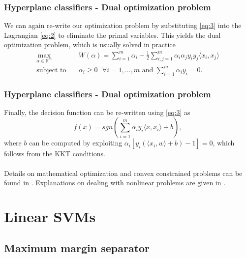 \documentclass{beamer}
\begin{document}
\begin{frame}{}
    \frametitle{Hyperplane classifiers - Dual optimization problem}
    We can again re-write our optimization problem by substituting \eqref{eq:3} into the Lagrangian \eqref{eq:2} to eliminate the primal variables. This yields the dual optimization problem, which is usually solved in practice
    \begin{equation} \label{eq:4}
        \begin{aligned}
            \max_{\alpha \in \mathbb{R}^m} \quad & W(\alpha) = \sum_{i=1}^{m} \alpha_i - \frac{1}{2} \sum_{i,j=1}^{m} \alpha_i \alpha_j y_i y_j \langle x_i,x_j \rangle \\
            \textrm{subject to} \quad & \alpha_i \geq 0 \text{ } \forall i = {1, \dots, m} \text{ and } \sum_{i=1}^{m} \alpha_i y_i = 0. 
        \end{aligned}
    \end{equation}
\end{frame}


\begin{frame}{}
    \frametitle{Hyperplane classifiers - Dual optimization problem}
    Finally, the decision function can be re-written using \eqref{eq:3} as
    \begin{equation} \label{eq:5}
        f(x) = sgn \left( \sum_{i=1}^{m} \alpha_i y_i \langle x,x_i \rangle + b \right),
    \end{equation}
    where $b$ can be computed by exploiting $\alpha_i \left[ y_i \left( \langle x_i,w \rangle + b \right) - 1 \right] = 0$, which follows from the KKT conditions. \\~\\
    Details on mathematical optimization and convex constrained problems can be found in \cite{Jarre}. Explanations on dealing with nonlinear problems are given in \cite{Reinhardt}.
\end{frame}



\section{Linear SVMs}

\subsection{Maximum margin separator}
\end{document}
